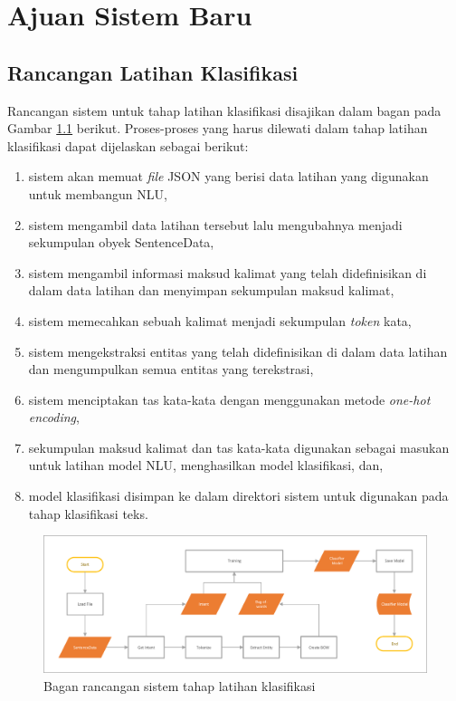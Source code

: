 \chapter{Ajuan Sistem Baru}

\section{Rancangan Latihan Klasifikasi}

Rancangan sistem untuk tahap latihan klasifikasi disajikan dalam bagan pada Gambar \ref{fig:design_training} berikut. Proses-proses yang harus dilewati dalam tahap latihan klasifikasi dapat dijelaskan sebagai berikut:

\begin{enumerate}
	\item sistem akan memuat \textit{file} JSON yang berisi data latihan yang digunakan untuk membangun NLU,
	\item sistem mengambil data latihan tersebut lalu mengubahnya menjadi sekumpulan obyek SentenceData,
	\item sistem mengambil informasi maksud kalimat yang telah didefinisikan di dalam data latihan dan menyimpan sekumpulan maksud kalimat,
	\item sistem memecahkan sebuah kalimat menjadi sekumpulan \textit{token} kata,
	\item sistem mengekstraksi entitas yang telah didefinisikan di dalam data latihan dan mengumpulkan semua entitas yang terekstrasi,
	\item sistem menciptakan tas kata-kata dengan menggunakan metode \textit{one-hot encoding},
	\item sekumpulan maksud kalimat dan tas kata-kata digunakan sebagai masukan untuk latihan model NLU, menghasilkan model klasifikasi, dan,
	\item model klasifikasi disimpan ke dalam direktori sistem untuk digunakan pada tahap klasifikasi teks.
\end{enumerate}

\begin{figure}[H]
	\centering
	\includegraphics[width=\textwidth, trim=2 2 2 2, clip]{resources/4-design_training.pdf}
	\caption{Bagan rancangan sistem tahap latihan klasifikasi}
	\label{fig:design_training}
\end{figure}

